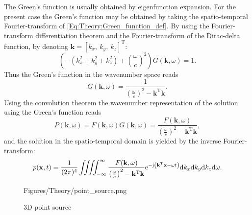 The Green's function is usually obtained by eigenfunction expansion. For the present case the Green's function may be obtained by taking the spatio-temporal Fourier-transform of \eqref{Eq:Theory:Green_function_def}. By using the Fourier-transform differentiation theorem and the Fourier-transform of the Dirac-delta function, by denoting $\mathbf{k} = [k_x,\ k_y,\ k_z]^{\mathrm{T}}$:
\begin{equation}
(-(k_x^2 + k_y^2 + k_z^2) + \left(\frac{\omega}{c} \right)^2)G(\mathbf{k},\omega) = 1.
\end{equation}
Thus the Green's function in the wavenumber space reads \cite{Devaney2012, Watanabe2015}
\begin{equation}
G(\mathbf{k},\omega) = \frac{1}{\left( \frac{\omega}{c}\right)^2 - \mathbf{k}^{\mathrm{T}} \mathbf{k}}.
\label{Eq:Theory:3D_kxkykzw_Green}
\end{equation}
Using the convolution theorem the wavenumber representation of the solution using the Green's function reads
\begin{equation}
P(\mathbf{k},\omega)  = F(\mathbf{k},\omega) G(\mathbf{k},\omega) =\frac{F(\mathbf{k},\omega)}{\left( \frac{\omega}{c}\right)^2 -  \mathbf{k}^{\mathrm{T}} \mathbf{k} },
\end{equation}
and the solution in the spatio-temporal domain is yielded by the inverse Fourier-transform:
\begin{equation}
p(\mathbf{x},t) =\frac{1}{(2\pi)^4} \iiiint^{\infty}_{-\infty} \frac{F(\mathbf{k},\omega)}{\left( \frac{\omega}{c}\right)^2 -  \mathbf{k}^{\mathrm{T}} \mathbf{k} } \mathrm{e}^{-\mathrm{j} \left( \mathbf{k}^{\mathrm{T}}\mathbf{x} - \omega t \right) } \mathrm{d} k_x \mathrm{d} k_y \mathrm{d} k_z \mathrm{d} \omega.
\end{equation}

\begin{figure}
	\centering
	\begin{overpic}[width = 1\columnwidth]{Figures/Theory/point_source.png}
	\end{overpic}
	\caption{3D point source}
	\label{Fig:Theory:point_source}
\end{figure}

